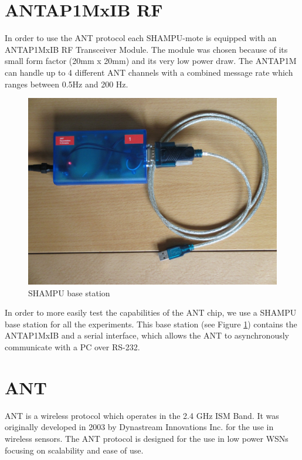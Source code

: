 \section{ANTAP1MxIB RF}
In order to use the ANT protocol each SHAMPU-mote is equipped with an ANTAP1MxIB RF Transceiver Module. The module was chosen because of its small form factor (20mm x 20mm) and its very low power draw. The ANTAP1M can handle up to 4 different ANT channels with a combined message rate which ranges between 0.5Hz and 200 Hz. 

\begin{figure}[h]
	\centering
	\includegraphics[scale=.5]{content/images/SHAMPUbase.JPG}
	\caption{SHAMPU base station}\label{fig:shampubase}
\end{figure}
In order to more easily test the capabilities of the ANT chip, we use a SHAMPU base station for all the experiments. This base station (see Figure \ref{fig:shampubase}) contains the ANTAP1MxIB and a serial interface, which allows the ANT to asynchronously communicate with a PC over RS-232. 

\section{ANT}
ANT \cite{DynastreamInnovationsInc.2013} is a wireless protocol which operates in the 2.4 GHz ISM Band. It was originally developed in 2003 by Dynastream Innovations Inc. for the use in wireless sensors. The ANT protocol is designed for the use in low power WSNs focusing on scalability and ease of use.

